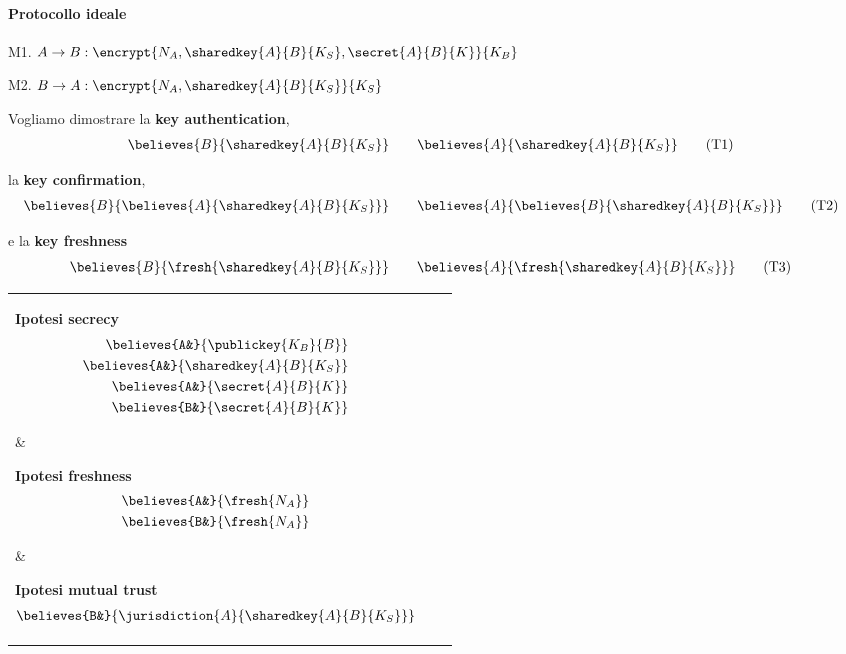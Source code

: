 \documentclass[a4paper]{article}
\begin{document}
\paragraph{Protocollo ideale}
\begin{list}{}{}
\item M1. $ A \rightarrow B: \encrypt{N_A, \sharedkey{A}{B}{K_S}, \secret{A}{B}{K}}{K_B} $
\item M2. $ B \rightarrow A: \encrypt{N_A, \sharedkey{A}{B}{K_S} }{K_S} $
\end{list}

Vogliamo dimostrare la {\bf key authentication},
\begin{align}
  \believes{B}{ \sharedkey{A}{B}{K_S} }& \qquad
  \believes{A}{ \sharedkey{A}{B}{K_S} } \tag{T1}
\end{align}

la {\bf key confirmation},
\begin{align}
  \believes{B}{ \believes{A}{ \sharedkey{A}{B}{K_S} } }& \qquad
  \believes{A}{ \believes{B}{ \sharedkey{A}{B}{K_S} } } \tag{T2}
\end{align}

e la {\bf key freshness}
\begin{align}
  \believes{B}{ \fresh{\sharedkey{A}{B}{K_S}} }& \qquad
  \believes{A}{ \fresh{\sharedkey{A}{B}{K_S}} } \tag{T3}
\end{align}


\begin{tabular}{ p{4cm} p{4cm} p{4cm} }

  \parbox[t][][t]{4cm} {
    {\bf Ipotesi secrecy}
    \begin{align}
      \believes{A&}{ \publickey{K_B}{B} }\\
      \believes{A&}{ \sharedkey{A}{B}{K_S} }\\
      \believes{A&}{ \secret{A}{B}{K} }\\
      \believes{B&}{ \secret{A}{B}{K} }
    \end{align}
  }&

  \parbox[t][][t]{4cm} {
    {\bf Ipotesi freshness}
    \begin{align}
      \believes{A&}{ \fresh{N_A} }\\
      \believes{B&}{ \fresh{N_A} }
    \end{align}
  }&

  \parbox[t][][t]{4cm} {
    {\bf Ipotesi mutual trust}
    \begin{align}
      \believes{B&}{ \jurisdiction{A}{ \sharedkey{A}{B}{K_S} } }
    \end{align}
  }
\end{tabular} \\
\end{document}
